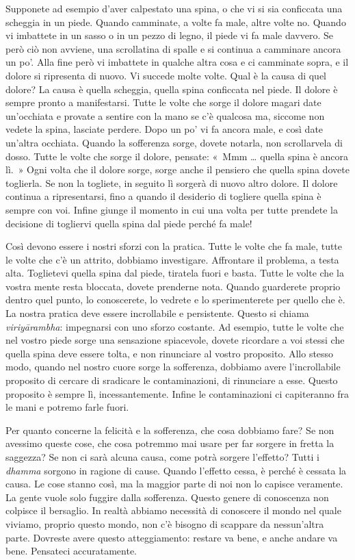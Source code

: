 Supponete ad esempio d'aver calpestato una spina, o che vi si sia
conficcata una scheggia in un piede. Quando camminate, a volte fa male,
altre volte no. Quando vi imbattete in un sasso o in un pezzo di legno,
il piede vi fa male davvero. Se però ciò non avviene, una scrollatina di
spalle e si continua a camminare ancora un po'. Alla fine però vi
imbattete in qualche altra cosa e ci camminate sopra, e il dolore si
ripresenta di nuovo. Vi succede molte volte. Qual è la causa di quel
dolore? La causa è quella scheggia, quella spina conficcata nel piede.
Il dolore è sempre pronto a manifestarsi. Tutte le volte che sorge il
dolore magari date un'occhiata e provate a sentire con la mano se c'è
qualcosa ma, siccome non vedete la spina, lasciate perdere. Dopo un po'
vi fa ancora male, e così date un'altra occhiata. Quando la sofferenza
sorge, dovete notarla, non scrollarvela di dosso. Tutte le volte che
sorge il dolore, pensate: «~Mmm \ldots{} quella spina è ancora lì.~» Ogni
volta che il dolore sorge, sorge anche il pensiero che quella spina
dovete toglierla. Se non la togliete, in seguito lì sorgerà di nuovo
altro dolore. Il dolore continua a ripresentarsi, fino a quando il
desiderio di togliere quella spina è sempre con voi. Infine giunge il
momento in cui una volta per tutte prendete la decisione di togliervi
quella spina dal piede perché fa male!

Così devono essere i nostri sforzi con la pratica. Tutte le volte che fa
male, tutte le volte che c'è un attrito, dobbiamo investigare.
Affrontare il problema, a testa alta. Toglietevi quella spina dal piede,
tiratela fuori e basta. Tutte le volte che la vostra mente resta
bloccata, dovete prenderne nota. Quando guarderete proprio dentro quel
punto, lo conoscerete, lo vedrete e lo sperimenterete per quello che è.
La nostra pratica deve essere incrollabile e persistente. Questo si
chiama \emph{viriyārambha}: impegnarsi con uno sforzo costante. Ad
esempio, tutte le volte che nel vostro piede sorge una sensazione
spiacevole, dovete ricordare a voi stessi che quella spina deve essere
tolta, e non rinunciare al vostro proposito. Allo stesso modo, quando
nel nostro cuore sorge la sofferenza, dobbiamo avere l'incrollabile
proposito di cercare di sradicare le contaminazioni, di rinunciare a
esse. Questo proposito è sempre lì, incessantemente. Infine le
contaminazioni ci capiteranno fra le mani e potremo farle fuori.

Per quanto concerne la felicità e la sofferenza, che cosa dobbiamo fare?
Se non avessimo queste cose, che cosa potremmo mai usare per far sorgere
in fretta la saggezza? Se non ci sarà alcuna causa, come potrà sorgere
l'effetto? Tutti i \emph{dhamma} sorgono in ragione di cause. Quando
l'effetto cessa, è perché è cessata la causa. Le cose stanno così, ma la
maggior parte di noi non lo capisce veramente. La gente vuole solo
fuggire dalla sofferenza. Questo genere di conoscenza non colpisce il
bersaglio. In realtà abbiamo necessità di conoscere il mondo nel quale
viviamo, proprio questo mondo, non c'è bisogno di scappare da
nessun'altra parte. Dovreste avere questo atteggiamento: restare va
bene, e anche andare va bene. Pensateci accuratamente.

